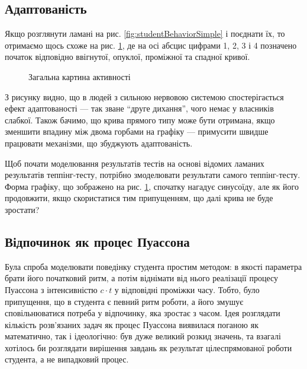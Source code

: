 \subsection{Адаптованість}
Якщо розглянути ламані на рис. \ref{fig:studentBehaviorSimple} і поєднати їх,
то отримаємо щось схоже на рис. \ref{fig:studentBehaviorCommon}, де на осі
абсцис цифрами 1, 2, 3 і 4 позначено початок відповідно ввігнутої, опуклої,
проміжної та спадної кривої.

\begin{figure}[h]
  \centering
  
  \caption{Загальна картина активності}
  \label{fig:studentBehaviorCommon}
\end{figure}

З рисунку видно, що в людей з сильною нервовою системою спостерігається ефект
адаптованості --- так зване ``друге дихання'', чого немає у власників слабкої.
Також бачимо, що крива прямого типу може бути отримана, якщо зменшити впадину
між двома горбами на графіку --- примусити швидше працювати механізми, що
збуджують адаптованість.

Щоб почати моделювання результатів тестів на основі відомих ламаних
результатів теппінг-тесту, потрібно змоделювати результати самого
теппінг-тесту.
Форма графіку, що зображено на рис. \ref{fig:studentBehaviorCommon},
спочатку нагадує синусоїду, але як його продовжити, якщо
скористатися тим припущенням, що далі крива не буде зростати?

\subsection{Відпочинок як процес Пуассона}

Була спроба моделювати поведінку студента простим методом: в якості параметра
брати його початковий ритм, а потім віднімати від нього реалізації процесу
Пуассона з інтенсивністю $c \cdot t$ у відповідні проміжки часу.
Тобто, було припущення, що в студента є певний ритм роботи, а його змушує
сповільнюватися потреба у відпочинку, яка зростає з часом.
Ідея розглядати кількість розв’язаних задач як процес Пуассона виявилася
поганою як математично, так і ідеологічно: був дуже великий розкид значень,
та взагалі хотілось би розглядати вирішення завдань як результат цілеспрямованої
роботи студента, а не випадковий процес.

